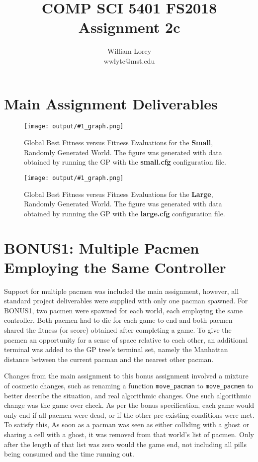 \documentclass[11pt]{article}
\title{COMP SCI 5401 FS2018 Assignment 2c}
\author{William  Lorey \\ wwlytc@mst.edu}
\date{}
\newcommand{\fitnessplotcaption}[2]{\caption{Global Best Fitness versus Fitness Evaluations for the \textbf{{#1}}, Randomly Generated World. The figure was generated with data obtained by running the GP with the \textbf{{#2}} configuration file.}}
\newcommand{\addgraphic}[1]{\centerline{\texttt{[image: output/\#1\_graph.png]}}}
\begin{document}
\maketitle

\tableofcontents

\section{Main Assignment Deliverables}

\begin{figure}[H]
    \addgraphic{small}
    \fitnessplotcaption{Small}{small.cfg}
    \label{fig:small}
\end{figure}

\begin{figure}[H]
    \addgraphic{large}
    \fitnessplotcaption{Large}{large.cfg}
    \label{fig:large}
\end{figure}


\section{BONUS1: Multiple Pacmen Employing the Same Controller}

Support for multiple pacmen was included the main assignment, however, all standard project 
deliverables were supplied with only one pacman spawned. For BONUS1, two pacmen were
spawned for each world, each employing the same controller. Both pacmen had to die
for each game to end and both pacmen shared the fitness (or score) obtained after
completing a game. To give the pacmen an opportunity for a sense of space relative to each other, 
an additional terminal was 
added to the GP tree's terminal set, namely the Manhattan distance between the 
current pacman and the nearest other pacman.

Changes from the main assignment to this bonus assignment involved a mixture of 
cosmetic changes, such as renaming a function \texttt{move\_pacman} to \texttt{move\_pacmen}
to better describe the situation, and real algorithmic changes. One such algorithmic
change was the game over check. As per the bonus specification, each game would
only end if all pacmen were dead, or if the other pre-existing conditions were met. 
To satisfy this, As soon as a pacman was seen as
either colliding with a ghost or sharing a cell with a ghost, it was removed from
that world's list of pacmen. Only after the length of that list was zero would the game
end, not including all pills being consumed and the time running out.
\end{document}
